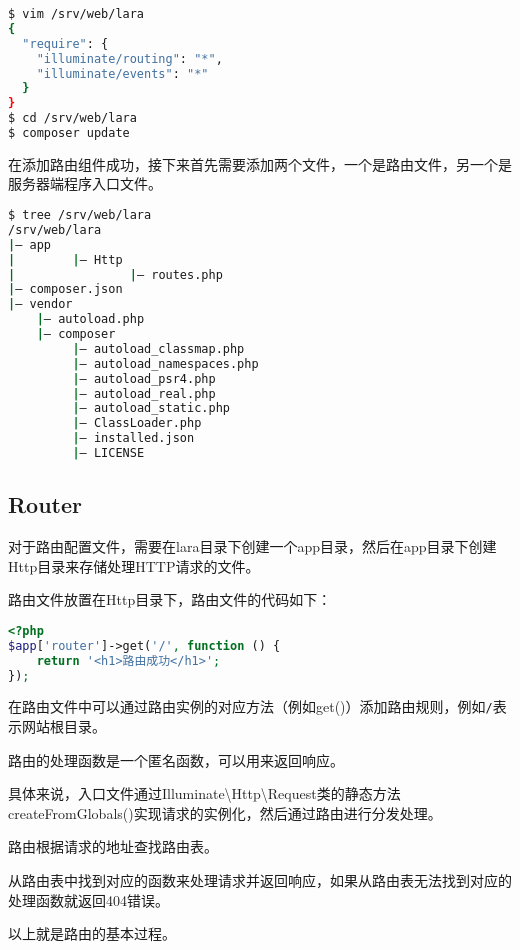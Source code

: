 \begin{lstlisting}[language=bash]
$ vim /srv/web/lara
{
  "require": {
    "illuminate/routing": "*",
    "illuminate/events": "*"
  }
}
$ cd /srv/web/lara
$ composer update
\end{lstlisting}



在添加路由组件成功，接下来首先需要添加两个文件，一个是路由文件，另一个是服务器端程序入口文件。

\begin{lstlisting}[language=bash]
$ tree /srv/web/lara
/srv/web/lara
|— app
|        |— Http
|                |— routes.php
|— composer.json
|— vendor
    |— autoload.php
    |— composer
         |— autoload_classmap.php
         |— autoload_namespaces.php
         |— autoload_psr4.php
         |— autoload_real.php
         |— autoload_static.php
         |— ClassLoader.php
         |— installed.json
         |— LICENSE
\end{lstlisting}

\subsection{Router}


对于路由配置文件，需要在lara目录下创建一个app目录，然后在app目录下创建Http目录来存储处理HTTP请求的文件。

路由文件放置在Http目录下，路由文件的代码如下：

\begin{lstlisting}[language=PHP]
<?php
$app['router']->get('/', function () {
    return '<h1>路由成功</h1>';
});
\end{lstlisting}

在路由文件中可以通过路由实例的对应方法（例如get()）添加路由规则，例如\texttt{/}表示网站根目录。

路由的处理函数是一个匿名函数，可以用来返回响应。

具体来说，入口文件通过Illuminate\textbackslash Http\textbackslash Request类的静态方法createFromGlobals()实现请求的实例化，然后通过路由进行分发处理。

\begin{compactenum}
\item 路由根据请求的地址查找路由表。
\item 从路由表中找到对应的函数来处理请求并返回响应，如果从路由表无法找到对应的处理函数就返回404错误。
\end{compactenum}

以上就是路由的基本过程。


